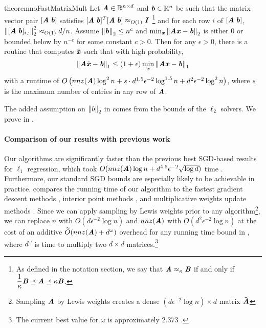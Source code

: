 \begin{restatable}[]{theorem}{noFastMatrixMult}
  \label{thm:noFastMatrixMult}
  Let $\AA \in \R^{n\times d}$ and $\bb \in \R^{n}$ be such that the matrix-vector pair $[\AA\;\bb]$ satisfies $[\AA\;\bb]^T [\AA\;\bb]\approx_{O(1)}\II$ \footnote{As defined in the notation section, we say that $\AA \approx_{\kappa} \BB$ if and only if
  $	\dfrac{1}{\kappa} \BB \preceq \AA \preceq \kappa \BB$.} and for each row $i$ of $[\AA\;\bb]$, $\norme{[\AA\;\bb]_{i,:}}^2 \approx_{O(1)} d/n$. Assume $\norme{\bb}\le n^c$ and $\min_{\xx} \norme{\AA \xx - \bb}$ is either 0 or bounded below by $n^{-c}$ for some constant $c > 0$. Then for any $\epsilon > 0$, there is a routine that computes $\tilde{\xx}$ such that with high probability,
  \[
  \norm{\AA\tilde{\xx} - \bb}_1 \leq (1 + \epsilon)\min_{\xx}\norm{\AA\xx - \bb}_1
  \]
  with a runtime of $O\left(nnz(\AA)\log^2{n} + s \cdot d^{1.5}\epsilon^{-2} \log^{1.5}{n} + d^2 \epsilon^{-2} \log^2{n} \right)$, where $s$ is the maximum number of entries in any row of $\AA$.  
\end{restatable}

\noindent The added assumption on $\norme{b}$ in  comes from the bounds of the $\ell_2$ solvers. We prove  in . 


\paragraph{Comparison of our results with previous work}

Our algorithms are significantly faster than the previous best SGD-based results for $\ell_1$ regression, which took $O(nnz(\AA)\log n+ d^{4.5}\epsilon^{-2}\sqrt{\log d})$ time \citep{YangCRM16}. Furthermore, our standard SGD bounds are especially likely to be achievable in practice.  compares the running time of our algorithm to the fastest gradient descent methods \citep{Clarkson05, Nesterov09, YangCRM16}, interior point methods \citep{MengM13mapreduce, LeeS15}, and multiplicative weights update methods \citep{CMMP13}. Since we can apply sampling by Lewis weights prior to any algorithm\footnote{Sampling $\AA$ by Lewis weights creates a dense $(d\epsilon^{-2}\log n) \times d$ matrix $\tilde{\AA}$}, we can replace $n$ with $O(d\epsilon^{-2} \log n)$ and $nnz(\AA)$ with $O(d^2 \epsilon^{-2} \log n)$ at the cost of an additive $\Otil(nnz(\AA) + d^\omega)$ overhead for any running time bound in , where $d^\omega$ is time to multiply two $d\times d$ matrices.\footnote{The current best value for $\omega$ is approximately $2.373$ \citep{Williams12, DavieS13, LeGall14}.}

